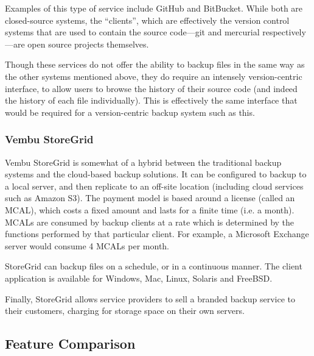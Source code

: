 Examples of this type of service include GitHub\cite{Github} and
BitBucket\cite{Bitbucket}. While both are closed-source systems, the
``clients'', which are effectively the version control systems that are used to
contain the source code---git and mercurial respectively---are open source
projects themselves.

Though these services do not offer the ability to backup files in the same way
as the other systems mentioned above, they do require an intensely
version-centric interface, to allow users to browse the history of their source
code (and indeed the history of each file individually). This is effectively
the same interface that would be required for a version-centric backup system
such as this.

\subsubsection{Vembu StoreGrid}

Vembu StoreGrid is somewhat of a hybrid between the traditional backup systems
and the cloud-based backup solutions. It can be configured to backup to a local
server, and then replicate to an off-site location (including cloud services
such as Amazon S3). The payment model is based around a license (called an
MCAL), which costs a fixed amount and lasts for a finite time (i.e. a month).
MCALs are consumed by backup clients at a rate which is determined by the
functions performed by that particular client. For example, a Microsoft
Exchange server would consume 4 MCALs per month.

StoreGrid can backup files on a schedule, or in a continuous manner. The client
application is available for Windows, Mac, Linux, Solaris and FreeBSD.

Finally, StoreGrid allows service providers to sell a branded backup service to
their customers, charging for storage space on their own servers.

\subsection{Feature Comparison}

